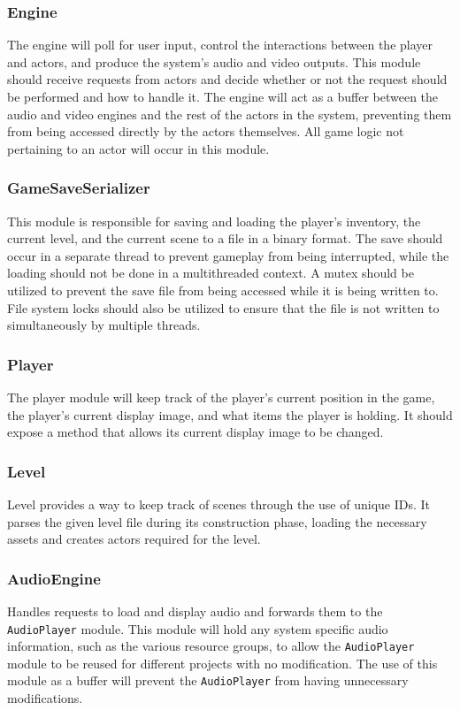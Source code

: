 \documentclass{article}
\begin{document}
    \subsubsection{Engine}
      The engine will poll for user input, control the interactions between the player and actors, and produce the system's audio and video outputs. This module should receive requests from actors and decide whether or not the request should be performed and how to handle it. The engine will act as a buffer between the audio and video engines and the rest of the actors in the system, preventing them from being accessed directly by the actors themselves. All game logic not pertaining to an actor will occur in this module.
    \subsubsection{GameSaveSerializer}
      This module is responsible for saving and loading the player's inventory, the current level, and the current scene to a file in a binary format. The save should occur in a separate thread to prevent gameplay from being interrupted, while the loading should not be done in a multithreaded context. A mutex should be utilized to prevent the save file from being accessed while it is being written to. File system locks should also be utilized to ensure that the file is not written to simultaneously by multiple threads.
    \subsubsection{Player}
      The player module will keep track of the player's current position in the game, the player's current display image, and what items the player is holding. It should expose a method that allows its current display image to be changed.
    \subsubsection{Level}
      Level provides a way to keep track of scenes through the use of unique IDs. It parses the given level file during its construction phase, loading the necessary assets and creates actors required for the level.
    \subsubsection{AudioEngine}
      Handles requests to load and display audio and forwards them to the \texttt{AudioPlayer} module. This module will hold any system specific audio information, such as the various resource groups, to allow the \texttt{AudioPlayer} module to be reused for different projects with no modification. The use of this module as a buffer will prevent the \texttt{AudioPlayer} from having unnecessary modifications.
\end{document}
